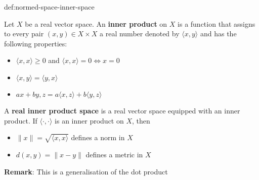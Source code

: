 \documentclass[landscape, 8pt]{extarticle}
\begin{document}
\begin{multicols}{3}
\begin{dfn}{def:normed-space-inner-space}{}

    Let $X$ be a real vector space. An \textbf{inner product} on $X$ is a function that assigns to every pair $(x,y)\in X \times X $ a real number denoted by $\langle x,y \rangle$ and has the following properties:
    \vspace{-3pt}
    \begin{itemize}
        \item $\langle x,x \rangle\ge 0$ and $\langle x,x \rangle = 0 \iff x = 0$
        \item $\langle x,y \rangle = \langle y,x \rangle$
        \item $ax + by, z = a\langle x,z \rangle + b\langle y,z \rangle$
    \end{itemize}

    \vspace{-5pt}
    \longrule{0.08ex}
    A \textbf{real inner product space} is a real vector space equipped with an inner product.
    If $\langle \cdot, \cdot \rangle$ is an inner product on $X$, then
    \vspace{-5pt}
    \begin{itemize}
        \item $\lVert x \rVert = \sqrt{\langle x,x \rangle}$ defines a norm in $X$
        \item $d(x,y) = \lVert x - y \rVert$ defines a metric in $X$
    \end{itemize}
    \vspace{-5pt}
    \textbf{Remark}: This is a generalisation of the dot product
\end{dfn}





\end{multicols}
\end{document}
